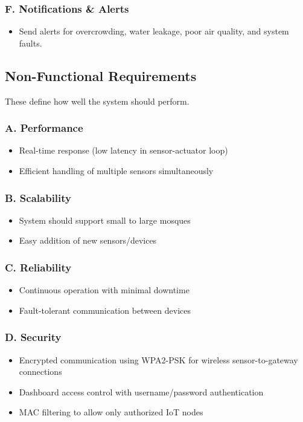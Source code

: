 \subsubsection*{F. Notifications \& Alerts}
\begin{itemize}
  \item Send alerts for overcrowding, water leakage, poor air quality, and system faults.
\end{itemize}

\subsection{Non-Functional Requirements}
These define how well the system should perform.

\subsubsection*{A. Performance}
\begin{itemize}
  \item Real-time response (low latency in sensor-actuator loop)
  \item Efficient handling of multiple sensors simultaneously
\end{itemize}

\subsubsection*{B. Scalability}
\begin{itemize}
  \item System should support small to large mosques
  \item Easy addition of new sensors/devices
\end{itemize}

\subsubsection*{C. Reliability}
\begin{itemize}
  \item Continuous operation with minimal downtime
  \item Fault-tolerant communication between devices
\end{itemize}

\subsubsection*{D. Security}
\begin{itemize}
  \item Encrypted communication using WPA2-PSK for wireless sensor-to-gateway connections
  \item Dashboard access control with username/password authentication
  \item MAC filtering to allow only authorized IoT nodes
\end{itemize}


